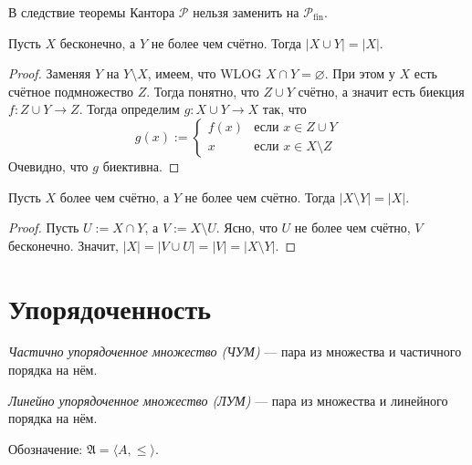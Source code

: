 \documentclass[12pt,a4paper]{article}
\newcommand{\subsets}{\ensuremath{\mathcal{P}}\xspace}
\newcommand{\finsubsets}{\ensuremath{\mathcal{P_{\mathrm{fin}}}}\xspace}
\begin{document}
    \begin{corollary}
        В следствие теоремы Кантора $\subsets$ нельзя заменить на $\finsubsets$.
    \end{corollary}

    \begin{theorem}[в ZFC]
        Пусть $X$ бесконечно, а $Y$ не более чем счётно. Тогда $|X \cup Y| = |X|$.
    \end{theorem}

    \begin{proof}
        Заменяя $Y$ на $Y\setminus X$, имеем, что WLOG $X \cap Y = \varnothing$. При этом у $X$ есть счётное подмножество $Z$. Тогда понятно, что $Z \cup Y$ счётно, а значит есть биекция $f: Z \cup Y \to Z$. Тогда определим $g: X \cup Y \to X$ так, что
        \[g(x) := \begin{cases}
            f(x)& \text{если $x \in Z \cup Y$}\\
            x& \text{если $x \in X \setminus Z$}
        \end{cases}\]
        Очевидно, что $g$ биективна.
    \end{proof}

    \begin{corollary}
        Пусть $X$ более чем счётно, а $Y$ не более чем счётно. Тогда $|X \setminus Y| = |X|$.
    \end{corollary}

    \begin{proof}
        Пусть $U := X \cap Y$, а $V := X \setminus U$. Ясно, что $U$ не более чем счётно, $V$ бесконечно. Значит, $|X| = |V \cup U| = |V| = |X \setminus Y|$. 
    \end{proof}

    \section{Упорядоченность}

    \begin{definition}
        \emph{Частично упорядоченное множество (ЧУМ)} --- пара из множества и частичного порядка на нём.

        \emph{Линейно упорядоченное множество (ЛУМ)} --- пара из множества и линейного порядка на нём.

        Обозначение: $\mathfrak{A} = \langle A, \leqslant \rangle$.
    \end{definition}
\end{document}
